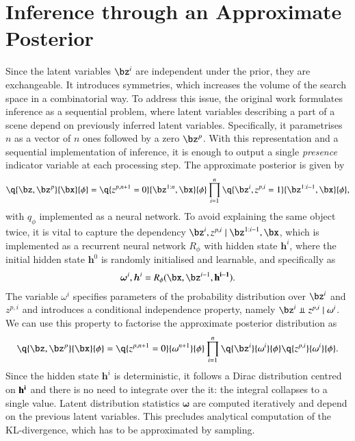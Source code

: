 \documentclass[]{article}
\begin{document}
\section{Inference through an Approximate Posterior}
    
    Since the latent variables $\bz^i$ are independent under the prior, they are exchangeable. It introduces symmetries, which increases the volume of the search space in a combinatorial way. To address this issue, the original work formulates inference as a sequential problem, where latent variables describing a part of a scene depend on previously inferred latent variables. Specifically, it parametrises $n$ as a vector of $n$ ones followed by a zero $\bz^p$. With this representation and a sequential implementation of inference, it is enough to output a single \emph{presence} indicator variable at each processing step. The approximate posterior is given by
    \begin{equation}
        \q{\bz, \bz^p}{\bx}{\phi} = \q{z^{p, n+1} = 0}{\bz^{1:n}, \bx}{\phi} \prod_{i=1}^n \q{\bz^i, z^{p, i} = 1}{\bz^{1:i-1}, \bx}{\phi},
        \label{eq:air_posterior}
    \end{equation}
    with $q_\phi$ implemented as a neural network. To avoid explaining the same object twice, it is vital to capture the dependency $\bz^i, z^{p, i} \mid \bz^{1:i-1}, \bx$, which is implemented as a recurrent neural network $R_\phi$ with hidden state $\bm{h}^i$, where the initial hidden state $\bm{h}^0$ is randomly initialised and learnable, and specifically as
    \begin{equation}
        \bm{\omega}^i, \bm{h}^i = R_\phi (\bx, \bz^{i-1}, \bf{h}^{i-1}).
        \label{eq:air_recurrence}
    \end{equation}
    The variable $\omega^i$ specifies parameters of the probability distribution over $\bz^i$ and $z^{p, i}$ and introduces a conditional independence property, namely $\bz^i \Perp z^{p, i} \mid \omega^i$. We can use this property to factorise the approximate posterior distribution as
    \begin{equation}
          \q{\bz, \bz^p}{\bx}{\phi} = \q{z^{p, n+1} = 0}{\omega^{n+1}}{\phi} \prod_{i=1}^n \q{\bz^i}{\omega^i}{\phi} \q{z^{p, i}}{\omega^i}{\phi}.
          \label{eq:air_factorisation}
    \end{equation}
    Since the hidden state $\bm{h}^i$ is deterministic, it follows a Dirac distribution centred on $\bf{h^i}$ and there is no need to integrate over the it: the integral collapses to a single value. Latent distribution statistics $\bm{\omega}$ are computed iteratively and depend on the previous latent variables. This precludes analytical computation of the KL-divergence, which has to be approximated by sampling.
    
\end{document}
